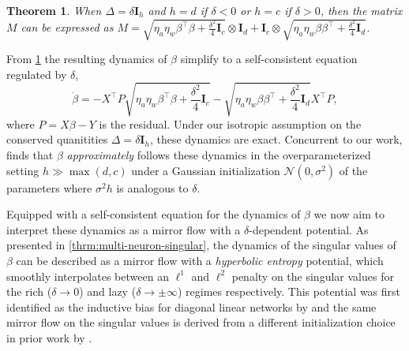 \documentclass{article}
\theoremstyle{plain}
\newtheorem{theorem}{Theorem}[section]
\theoremstyle{definition}
\theoremstyle{remark}
\begin{document}
\begin{theorem}
    \label{thrm:vec_beta-isotropic}
    When $\Delta = \delta \mathbf{I}_h$ and $h = d$ if $\delta <0$ or $h = c$ if $\delta > 0$, then the matrix $M$ can be expressed as $M = \sqrt{\eta_a \eta_w\beta^{\intercal}\beta + \frac{\delta^2}{4}\mathbf{I}_c}   \otimes \mathbf{I}_d + \mathbf{I}_c \otimes \sqrt{\eta_a\eta_w \beta \beta^{\intercal} + \frac{\delta^2}{4}\mathbf{I}_d}$.
\end{theorem}

From \cref{thrm:vec_beta-isotropic} the resulting dynamics of $\beta$ simplify to a self-consistent equation regulated by $\delta$,
\begin{equation}
    \dot{\beta} = -X^\intercal P \sqrt{\eta_a\eta_w \beta^\intercal\beta + \frac{\delta^2}{4} \mathbf{I}_c} - \sqrt{\eta_a\eta_w \beta\beta^\intercal + \frac{\delta^2}{4} \mathbf{I}_d}X^\intercal P,
\end{equation}
where $P = X\beta - Y$ is the residual.
% 
Under our isotropic assumption on the conserved quanitities $\Delta = \delta \mathbf{I}_h$, these dynamics are exact. Concurrent to our work, \citet{tu2024mixed} finds that $\beta$ \textit{approximately} follows these dynamics in the overparameterized setting $h \gg \max(d, c)$ under a Gaussian initialization $\mathcal{N}(0,\sigma^2)$ of the parameters where $\sigma^2 h$ is analogous to $\delta$.


Equipped with a self-consistent equation for the dynamics of $\beta$ we now aim to interpret these dynamics as a mirror flow with a $\delta$-dependent potential.
%
As presented in \cref{thrm:multi-neuron-singular}, the dynamics of the singular values of $\beta$ can be described as a mirror flow with a \emph{hyperbolic entropy} potential, which smoothly interpolates between an $\ell^1$ and $\ell^2$ penalty on the singular values for the rich ($\delta \to 0$) and lazy ($\delta \to \pm \infty$) regimes respectively.
%
This potential was first identified as the inductive bias for diagonal linear networks by \citet{woodworth2020kernel} and the same mirror flow on the singular values is derived from a different initialization choice in prior work by \citet{varre2024spectral}.
%
\end{document}
